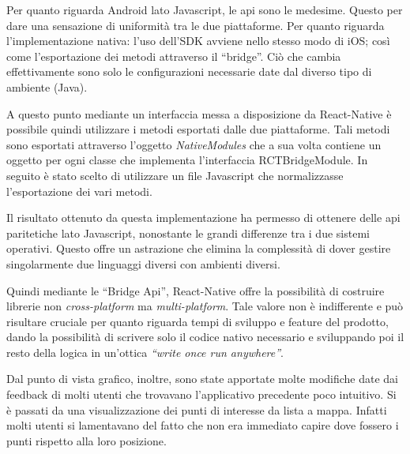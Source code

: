Per quanto riguarda Android lato Javascript, le api sono le medesime. Questo per dare una sensazione di uniformità tra le due piattaforme. Per quanto riguarda l’implementazione nativa: l'uso dell’SDK avviene nello stesso modo di iOS; così come l’esportazione dei metodi attraverso il “bridge”. Ciò che cambia effettivamente sono solo le configurazioni necessarie date dal diverso tipo di ambiente (Java).\vspace{5mm}

A questo punto mediante un interfaccia messa a disposizione da React-Native è possibile quindi utilizzare i metodi esportati dalle due piattaforme. Tali metodi sono esportati attraverso l’oggetto \emph{NativeModules} che a sua volta contiene un oggetto per ogni classe che implementa l’interfaccia RCTBridgeModule. In seguito è stato scelto di utilizzare un file Javascript che normalizzasse l’esportazione dei vari metodi.\vspace{5mm}

Il risultato ottenuto da questa implementazione ha permesso di ottenere delle api paritetiche lato Javascript, nonostante le grandi differenze tra i due sistemi operativi. Questo offre un astrazione che elimina la complessità di dover gestire singolarmente due linguaggi diversi con ambienti diversi. \vspace{5mm}

Quindi mediante le “Bridge Api”, React-Native offre la possibilità di costruire librerie non \emph{cross-platform} ma \emph{multi-platform}. Tale valore non è indifferente e può risultare cruciale per quanto riguarda tempi di sviluppo e feature del prodotto, dando la possibilità di scrivere solo il codice nativo necessario e sviluppando poi il resto della logica in un'ottica \emph{“write once run anywhere”}.\vspace{5mm}

Dal punto di vista grafico, inoltre, sono state apportate molte modifiche date dai feedback di molti utenti che trovavano l’applicativo precedente poco intuitivo. Si è passati da una visualizzazione dei punti di interesse da lista a mappa. Infatti molti utenti si lamentavano del fatto che non era immediato capire dove fossero i punti rispetto alla loro posizione.\vspace{5mm}

